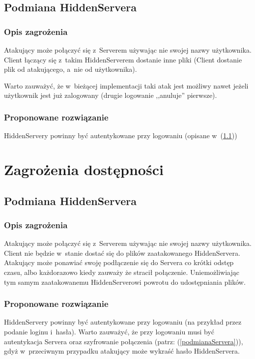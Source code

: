 \documentclass[a4paper,notitlepage]{article}
\begin{document}
\subsection{Podmiana HiddenServera}
\subsubsection*{Opis zagrożenia}
Atakujący może połączyć się z~Serverem używając nie swojej nazwy użytkownika.
Client łączący się z~takim HiddenServerem dostanie inne pliki 
(Client dostanie plik od atakującego, a~nie od użytkownika).

Warto zauważyć, że w~bieżącej implementacji taki atak jest możliwy nawet
jeżeli użytkownik jest już zalogowany (drugie logowanie ,,anuluje'' pierwsze).
\subsubsection*{Proponowane rozwiązanie}
HiddenServery powinny być autentykowane przy logowaniu 
(opisane w~(\ref{podmianaHiddenServera}))

\section{Zagrożenia dostępności}
\subsection{Podmiana HiddenServera}
\label{podmianaHiddenServera}
\subsubsection*{Opis zagrożenia}
Atakujący może połączyć się z~Serverem używając nie swojej nazwy użytkownika.
Client nie będzie w~stanie dostać się do plików zaatakowanego HiddenServera.
Atakujący może ponawiać swoję podłączenie się do Servera co krótki odstęp czasu, 
albo każdorazowo kiedy zauważy że stracił połączenie. Uniemożliwiając tym samym
zaatakowanemu HiddenServerowi powrotu do udostępniania plików.

\subsubsection*{Proponowane rozwiązanie}
HiddenServery powinny być autentykowane przy logowaniu (na przykład przez
podanie loginu i~hasła). Warto zauważyć, że przy logowaniu musi być
autentykacja Servera oraz szyfrowanie połączenia 
(patrz: (\ref{podmianaServera})), gdyż w~przeciwnym
przypadku atakujący może wykraść hasło HiddenServera.
\end{document}
